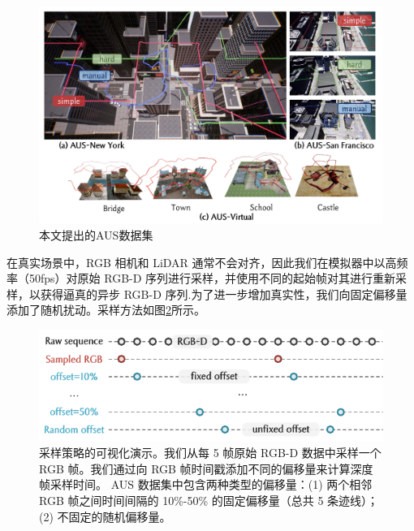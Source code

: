 \begin{figure}[ht]
    \centering
    \includegraphics[width=\textwidth]{undergraduate-thesis/images/experiments/Dataset-city.pdf}
    \caption{本文提出的AUS数据集}
    \label{fig:exp-aus-dataset}
\end{figure}

在真实场景中，RGB 相机和 LiDAR 通常不会对齐，因此我们在模拟器中以高频率（50fps）对原始 RGB-D 序列进行采样，并使用不同的起始帧对其进行重新采样，以获得逼真的异步 RGB-D 序列.为了进一步增加真实性，我们向固定偏移量添加了随机扰动。采样方法如图\ref{fig:exp-aus-offset}所示。

\begin{figure}[ht]
    \centering
    \includegraphics[width=\textwidth]{undergraduate-thesis/images/experiments/offset.pdf}
    \caption{采样策略的可视化演示。我们从每 5 帧原始 RGB-D 数据中采样一个 RGB 帧。我们通过向 RGB 帧时间戳添加不同的偏移量来计算深度帧采样时间。 AUS 数据集中包含两种类型的偏移量：(1) 两个相邻 RGB 帧之间时间间隔的 10\%-50\% 的固定偏移量（总共 5 条迹线）； (2) 不固定的随机偏移量。}
    \label{fig:exp-aus-offset}
\end{figure}


